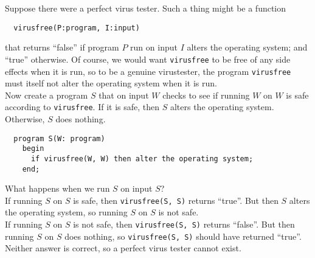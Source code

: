 \documentclass[12pt]{article}
\theoremstyle{plain}
\theoremstyle{definition}
\begin{document}
Suppose there were a perfect virus tester.
Such a thing might be a function
\begin{verbatim}
  virusfree(P:program, I:input)
\end{verbatim}
that returns ``false'' if program $P$ run on input $I$ alters the operating system; and ``true'' otherwise.
Of course, we would want \texttt{virusfree} to be free of any side effects when it is run, so to be a genuine virustester, the program \texttt{virusfree} must itself not alter the operating system when it is run. \\

Now create a program $S$ that on input $W$ checks to see if running $W$ on $W$ is safe according to \texttt{virusfree}.
If it is safe, then $S$ alters the operating system.
Otherwise, $S$ does nothing.
\begin{verbatim}
  program S(W: program)
    begin
      if virusfree(W, W) then alter the operating system;
    end;
\end{verbatim}
What happens when we run $S$ on input $S$? \\

If running $S$ on $S$ is safe, then \texttt{virusfree(S, S)} returns ``true''.
But then $S$ alters the operating system, so running $S$ on $S$ is not safe. \\

If running $S$ on $S$ is not safe, then \texttt{virusfree(S, S)} returns ``false''.
But then running $S$ on $S$ does nothing, so \texttt{virusfree(S, S)} should have returned ``true''. \\

Neither answer is correct, so a perfect virus tester cannot exist.


\clearpage
\printindex
\end{document}

